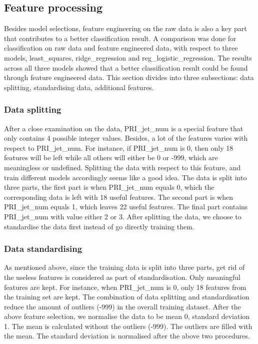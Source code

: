 \documentclass[10pt,conference,compsocconf]{IEEEtran}
\begin{document}
\subsection{Feature processing}

Besides model selections, feature engineering on the raw data is also a key part that contributes to a better classification result. A comparison was done for classification on raw data and feature engineered data, with respect to three models, least\_squares, ridge\_regression and reg\_logistic\_regression. The results across all three models showed that a better classification result could be found through feature engineered data. This section divides into three subsections: data splitting, standardising data, additional features.

\subsubsection{Data splitting}
After a close examination on the data, PRI\_jet\_num is a special feature that only contains 4 possible integer values. Besides, a lot of the features varies with respect to PRI\_jet\_num. For instance, if PRI\_jet\_num is 0, then only 18 features will be left while all others will either be 0 or -999, which are meaningless or undefined. Splitting the data with respect to this feature, and train different models accordingly seems like a good idea. The data is split into three parts, the first part is when PRI\_jet\_num equals 0, which the corresponding data is left with 18 useful features. The second part is when PRI\_jet\_num equals 1, which leaves 22 useful features. The final part contains PRI\_jet\_num with value either 2 or 3. After splitting the data, we choose to standardise the data first instead of go directly training them.

\subsubsection{Data standardising}
As mentioned above, since the training data is split into three parts, get rid of the useless features is considered as part of standardisation. Only meaningful features are kept. For instance, when PRI\_jet\_num is 0, only 18 features from the training set are kept. The combination of data splitting and standardisation reduce the amount of outliers (-999) in the overall training dataset. 
After the above feature selection, we normalise the data to be mean 0, standard deviation 1. The mean is calculated without the outliers (-999). The outliers are filled with the mean. The standard deviation is normalised after the above two procedures.
\end{document}
